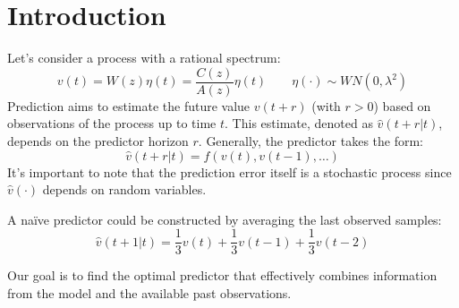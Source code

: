 \section{Introduction}

Let's consider a process with a rational spectrum:
\[v(t)=W(z)\eta(t)=\dfrac{C(z)}{A(z)}\eta(t) \qquad \eta(\cdot)\sim WN(0,\lambda^2)\]
Prediction aims to estimate the future value $v(t+r)$ (with $r>0$) based on observations of the process up to time $t$.
This estimate, denoted as $\hat{v}(t+r|t)$, depends on the predictor horizon $r$. 
Generally, the predictor takes the form:
\[\hat{v}(t+r|t)=f\left( v(t),v(t-1),\dots \right)\]
It's important to note that the prediction error itself is a stochastic process since $\hat{v}(\cdot)$ depends on random variables.
\begin{example}
    A naïve predictor could be constructed by averaging the last observed samples:
    \[\hat{v}(t+1|t)=\dfrac{1}{3}v(t)+\dfrac{1}{3}v(t-1)+\dfrac{1}{3}v(t-2)\]
\end{example}
Our goal is to find the optimal predictor that effectively combines information from the model and the available past observations. 